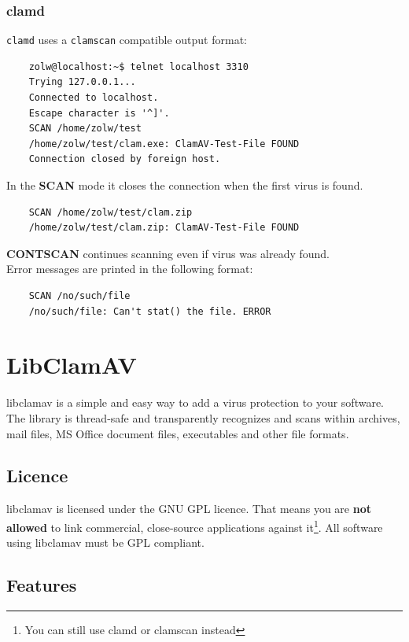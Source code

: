 \documentclass[a4paper,titlepage,12pt]{article}
\begin{document}
    \subsubsection{clamd}
    \verb+clamd+ uses a \verb+clamscan+ compatible output format:
    \begin{verbatim}
	zolw@localhost:~$ telnet localhost 3310
	Trying 127.0.0.1...
	Connected to localhost.
	Escape character is '^]'.
	SCAN /home/zolw/test
	/home/zolw/test/clam.exe: ClamAV-Test-File FOUND
	Connection closed by foreign host.
    \end{verbatim}
    In the \textbf{SCAN} mode it closes the connection when the first virus
    is found.
    \begin{verbatim}
	SCAN /home/zolw/test/clam.zip
	/home/zolw/test/clam.zip: ClamAV-Test-File FOUND
    \end{verbatim}
    \textbf{CONTSCAN} continues scanning even if virus was already found.\\
    Error messages are printed in the following format:
    \begin{verbatim}
	SCAN /no/such/file
	/no/such/file: Can't stat() the file. ERROR
    \end{verbatim}

    \section{LibClamAV}
    libclamav is a simple and easy way to add a virus protection to your
    software. The library is thread-safe and transparently recognizes and
    scans within archives, mail files, MS Office document files, executables
    and other file formats.

    \subsection{Licence}
    libclamav is licensed under the GNU GPL licence. That means you are
    \textbf{not allowed} to link commercial, close-source applications
    against it\footnote{You can still use clamd or clamscan instead}.
    All software using libclamav must be GPL compliant.

    \subsection{Features}
\end{document}

